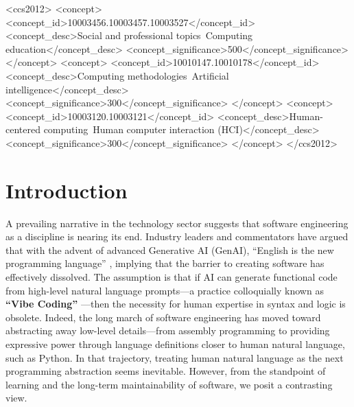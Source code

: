 \documentclass[sigconf]{acmart}
\begin{document}
\begin{CCSXML}
<ccs2012>
    <concept>
        <concept_id>10003456.10003457.10003527</concept_id>
        <concept_desc>Social and professional topics~Computing education</concept_desc>
        <concept_significance>500</concept_significance>
    </concept>
    <concept>
        <concept_id>10010147.10010178</concept_id>
        <concept_desc>Computing methodologies~Artificial intelligence</concept_desc>
        <concept_significance>300</concept_significance>
    </concept>
    <concept>
        <concept_id>10003120.10003121</concept_id>
        <concept_desc>Human-centered computing~Human computer interaction (HCI)</concept_desc>
        <concept_significance>300</concept_significance>
    </concept>
</ccs2012>
\end{CCSXML}



\maketitle

\section{Introduction}

A prevailing narrative in the technology sector suggests that software engineering as a discipline is nearing its end. Industry leaders and commentators have argued that with the advent of advanced Generative AI (GenAI), ``English is the new programming language'' \cite{world_governments_summit_2024_jensen_huang,karpathy2023english}, implying that the barrier to creating software has effectively dissolved. The assumption is that if AI can generate functional code from high-level natural language prompts—a practice colloquially known as \textbf{``Vibe Coding''} \cite{karpathy2024}—then the necessity for human expertise in syntax and logic is obsolete. Indeed, the long march of software engineering has moved toward abstracting away low-level details—from assembly programming to providing expressive power through language definitions closer to human natural language, such as Python. In that trajectory, treating human natural language as the next programming abstraction seems inevitable. However, from the standpoint of learning and the long-term maintainability of software, we posit a contrasting view.
\end{document}
